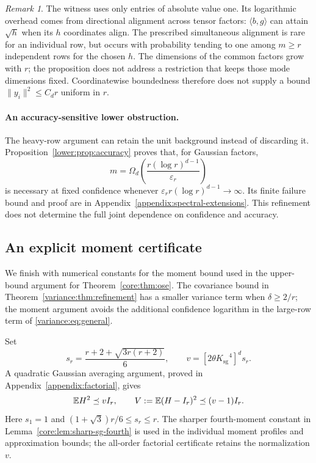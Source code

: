 \documentclass[11pt,a4paper]{article}
\theoremstyle{definition}\newtheorem{definition}[theorem]{Definition}
\theoremstyle{remark}\newtheorem{remark}[theorem]{Remark}
\numberwithin{equation}{section}
\newcommand{\Ksg}{{K_{\mathrm{sg}}}}\newcommand{\Cfour}{{C_4}}
\begin{document}
\begin{remark}\label{lower:rem:bounded-entries}
The witness uses only entries of absolute value one. Its logarithmic
overhead comes from directional alignment across tensor factors:
$\langle b,g\rangle$ can attain $\sqrt h$ when its $h$ coordinates align.
The prescribed simultaneous alignment is rare for an individual row,
but occurs with probability tending to one among $m\ge r$ independent
rows for the chosen $h$. The dimensions of the common factors grow
with $r$; the proposition does not address a restriction that keeps
those mode dimensions fixed. Coordinatewise boundedness therefore
does not supply a bound $\|y_i\|^2\le C_dr$ uniform in $r$.
\end{remark}


\paragraph{An accuracy-sensitive lower obstruction.}
The heavy-row argument can retain the unit background instead of discarding
it. Proposition~\ref{lower:prop:accuracy} proves that, for Gaussian factors,
\[
 m=\Omega_d\!\left(\frac{r(\log r)^{d-1}}{\varepsilon_r}\right)
\]
is necessary at fixed confidence whenever
$\varepsilon_r r(\log r)^{d-1}\to\infty$. Its finite failure bound and proof
are in Appendix~\ref{appendix:spectral-extensions}. This refinement does
not determine the full joint dependence on confidence and accuracy.

\subsection{An explicit moment certificate}
\label{core:sec:certificate}
We finish with numerical constants for the moment bound used in the
upper-bound argument for Theorem~\ref{core:thm:ose}. The covariance
bound in Theorem~\ref{variance:thm:refinement} has a smaller variance
term when $\delta\ge2/r$; the moment argument avoids the additional
confidence logarithm in the large-row term of \eqref{variance:eq:general}.

Set
\begin{equation}\label{core:eq:constants}
 s_r=\frac{r+2+\sqrt{3r(r+2)}}6,\qquad
 v=[2\theta\Ksg^4]^d s_r.
\end{equation}
A quadratic Gaussian averaging argument, proved in
Appendix~\ref{appendix:factorial}, gives
\begin{equation}\label{core:eq:variance}
 \mathbb E H^2\preceq vI_r,\qquad
 V:=\mathbb E(H-I_r)^2\preceq(v-1)I_r.
\end{equation}
Here $s_1=1$ and $(1+\sqrt3)r/6\le s_r\le r$.
The sharper fourth-moment constant in Lemma~\ref{core:lem:sharp-sg-fourth}
is used in the individual moment profiles and approximation bounds;
the all-order factorial certificate retains the normalization $v$.
\end{document}
